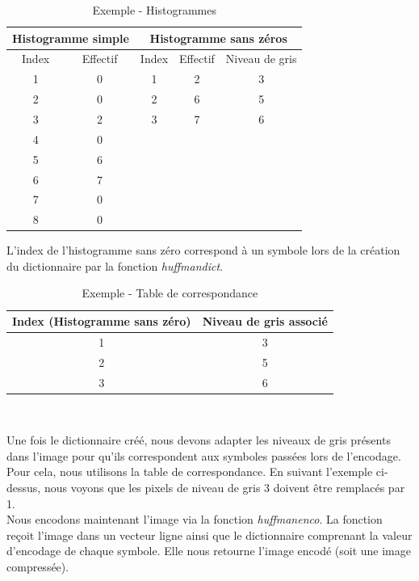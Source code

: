 \documentclass[a4paper, 12pt]{article}
\begin{document}
\begin{table}[!h]
	\centering
		\begin{tabular}{|c c|c c c|}
			\hline 
			\multicolumn{2}{|c|}{Histogramme simple} & \multicolumn{3}{|c|}{ Histogramme sans zéros } \\
			\hline Index & Effectif & Index & Effectif & Niveau de gris\\
			\hline
						1 & 0 & 1  & 2 & 3 \\
						2 & 0 & 2  & 6 & 5\\
						3 & 2 & 3  & 7 & 6\\
						4 & 0 &  & &  \\
						5 & 6 &  & &  \\
						6 & 7 &  & &  \\
						7 & 0 &  & & 	\\
						8 & 0 &  & & 	\\
			\hline
		\end{tabular}
	\caption{Exemple - Histogrammes}
	\label{tab:Histogrammes}
\end{table}

L'index de l'histogramme sans zéro correspond à un symbole lors de la création du dictionnaire par la fonction \textit{huffmandict}. \\

\begin{table}[!h]
	\centering
		\begin{tabular}{|c|c|}
			\hline 
				Index (Histogramme sans zéro) & Niveau de gris associé \\
			\hline 
				1 & 3 \\
				2 & 5 \\
				3 & 6 \\
			\hline
		\end{tabular} \\
	\caption{Exemple - Table de correspondance}
	\label{tab:TableDeCorrespondance}
\end{table}

Une fois le dictionnaire créé, nous devons adapter les niveaux de gris présents dans l'image pour qu'ils correspondent aux symboles passées lors de l'encodage. Pour cela, nous utilisons la table de correspondance. En suivant l'exemple ci-dessus, nous voyons que les pixels de niveau de gris 3 doivent être remplacés par 1. \\

Nous encodons maintenant l'image via la fonction \textit{huffmanenco}. La fonction reçoit l'image dans un vecteur ligne ainsi que le dictionnaire comprenant la valeur d'encodage de chaque symbole. Elle nous retourne l'image encodé (soit une image compressée). \\
\end{document}
